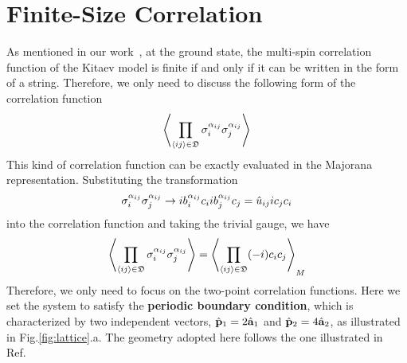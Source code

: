 \section{Finite-Size Correlation}
As mentioned in our work~\cite{wang2026exactorganizationdensitymatrices}, at the ground state, the multi-spin correlation function of the Kitaev model is finite if and only if it can be written in the form of a string. Therefore, we only need to discuss the following form of the correlation function
\[
\left\langle 
    \prod_{\langle ij \rangle\in\mathfrak{D}}
    \sigma_{i}^{\alpha_{ij}}\sigma_{j}^{\alpha_{ij}}
 \right\rangle
\]
This kind of correlation function can be exactly evaluated in the Majorana representation. Substituting the transformation 
\[
\sigma_{i}^{\alpha_{ij}}\sigma_{j}^{\alpha_{ij}} \to i b^{\alpha_{ij}}_i c_i  i b^{\alpha_{ij}}_j c_j = \hat{u}_{ij} ic_jc_i
\]
into the correlation function and taking the trivial gauge, we have
\[
\left\langle 
    \prod_{\langle ij \rangle\in\mathfrak{D}}
    \sigma_{i}^{\alpha_{ij}}\sigma_{j}^{\alpha_{ij}}
 \right\rangle
=
\left\langle 
    \prod_{\langle ij \rangle\in\mathfrak{D}}
    (-i) c_ic_j
 \right\rangle_M
\]
Therefore, we only need to focus on the two-point correlation functions. Here we set the system to satisfy the \textbf{periodic boundary condition}, which is characterized by two independent vectors, $\hat{\mathbf{p}}_1 = 2\hat{\mathbf{a}}_1$ and $\hat{\mathbf{p}}_2 = 4\hat{\mathbf{a}}_2$, as illustrated in Fig.\ref{fig:lattice}.a. The geometry adopted here follows the one illustrated in Ref.~\cite{Pedrocchi-Chesi-Loss_2011}

